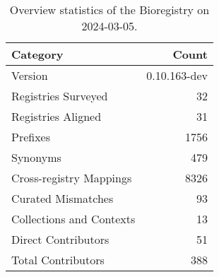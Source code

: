 \begin{table}
\caption{Overview statistics of the Bioregistry on 2024-03-05.}
\label{tab:bioregistry-summary}
\begin{tabular}{lr}
\toprule
Category & Count \\
\midrule
Version & 0.10.163-dev \\
Registries Surveyed & 32 \\
Registries Aligned & 31 \\
Prefixes & 1756 \\
Synonyms & 479 \\
Cross-registry Mappings & 8326 \\
Curated Mismatches & 93 \\
Collections and Contexts & 13 \\
Direct Contributors & 51 \\
Total Contributors & 388 \\
\bottomrule
\end{tabular}
\end{table}
